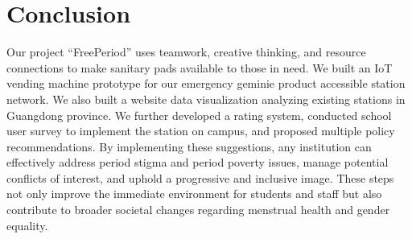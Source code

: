 \section{Conclusion}
Our project “FreePeriod” uses teamwork, creative thinking, and resource connections to make sanitary pads available to those in need. We built an IoT vending machine prototype for our emergency geminie product accessible station network. We also built a website data visualization analyzing existing stations in Guangdong province. We further developed a rating system, conducted school user survey to implement the station on campus, and proposed multiple policy recommendations. By implementing these suggestions, any institution can effectively address period stigma and period poverty issues, manage potential conflicts of interest, and uphold a progressive and inclusive image. These steps not only improve the immediate environment for students and staff but also contribute to broader societal changes regarding menstrual health and gender equality.